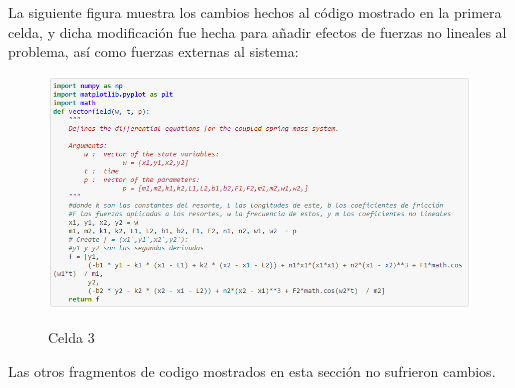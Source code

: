 \documentclass{article}
\begin{document}
La siguiente figura muestra los cambios hechos al código mostrado en la primera celda, y dicha modificación fue hecha para añadir efectos de fuerzas no lineales al problema, así como fuerzas externas al sistema:
\begin{figure}[H]
    \caption{Celda 3}
    \includegraphics[width=1\textwidth]{Celda5.PNG}
    \centering
    \label{Cod}
\end{figure}

Las otros fragmentos de codigo mostrados en esta sección no sufrieron cambios.
\end{document}
